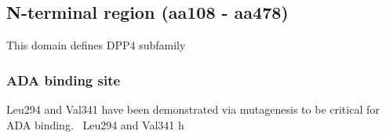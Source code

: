 \subsection{N-terminal region (aa108 - aa478)}

This domain defines DPP4 subfamily

\subsubsection{ADA binding site}
Leu294 and Val341 have been demonstrated via mutagenesis to be critical for ADA binding.~\cite{Abbott_1999} Leu294 and Val341 h
